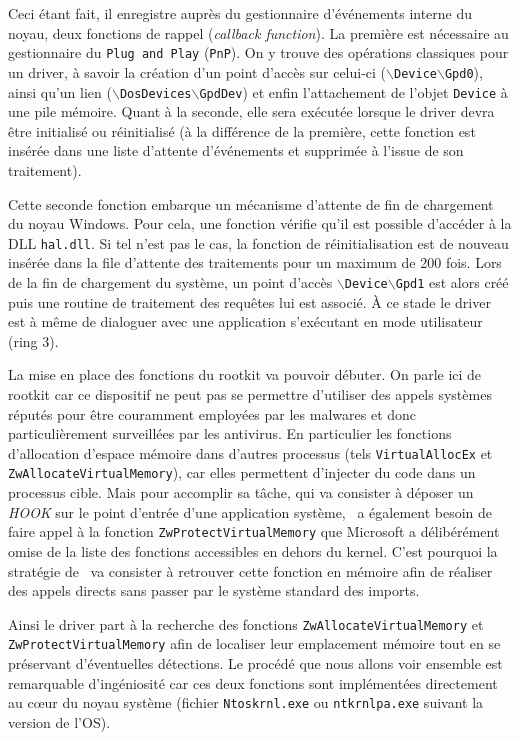 Ceci étant fait, il enregistre auprès du gestionnaire d'événements interne du noyau, deux fonctions de rappel ({\em callback function}). La première est nécessaire au gestionnaire du \texttt{Plug and Play} (\texttt{PnP}). On y trouve des opérations classiques pour un driver, à savoir la création d'un point d'accès sur celui-ci ($\backslash$\texttt{Device}$\backslash$\texttt{Gpd0}), ainsi qu'un lien ($\backslash$\texttt{DosDevices}$\backslash$\texttt{GpdDev}) et enfin l'attachement de l'objet \texttt{Device} à une pile mémoire. Quant à la seconde, elle sera exécutée lorsque le driver devra être initialisé ou réinitialisé (à la différence de la première, cette fonction est insérée dans une liste d'attente d'événements et supprimée à l'issue de son traitement). 
  
Cette seconde fonction embarque un mécanisme d'attente de fin de chargement du noyau Windows. Pour cela, une fonction vérifie qu'il est possible d'accéder à la DLL \texttt{hal.dll}. Si tel n'est pas le cas, la fonction de réinitialisation est de nouveau insérée dans la file d'attente des traitements pour un maximum de 200 fois. 
Lors de la fin de chargement du système, un point d'accès $\backslash$\texttt{Device}$\backslash$\texttt{Gpd1} est alors créé puis une routine de traitement des requêtes lui est associé. À ce stade le driver est à même de dialoguer avec une application s'exécutant en mode utilisateur (ring 3). 

La mise en place des fonctions du rootkit va pouvoir débuter. On parle ici de rootkit car ce dispositif ne peut pas se permettre d'utiliser des appels systèmes réputés pour être couramment employées par les malwares et donc particulièrement surveillées par les antivirus. En particulier les fonctions d'allocation d'espace mémoire dans d'autres processus (tels \texttt{VirtualAllocEx} et \texttt{ZwAllocateVirtualMemory}), car elles permettent d'injecter du code dans un processus cible. Mais pour accomplir sa tâche, qui va consister à déposer un \emph{HOOK} sur le point d'entrée d'une application système, \Duqu\ a également besoin de faire appel à la fonction \texttt{ZwProtectVirtualMemory} que Microsoft a délibérément omise de la liste des fonctions accessibles en dehors du kernel. C'est pourquoi la stratégie de \Duqu\ va consister à retrouver cette fonction en mémoire afin de réaliser des appels directs sans passer par le système standard des imports.

Ainsi le driver part à la recherche des fonctions \texttt{ZwAllocateVirtualMemory} et \texttt{ZwProtectVirtualMemory} afin de localiser leur emplacement mémoire tout en se préservant d'éventuelles détections. Le procédé que nous allons voir ensemble est remarquable d'ingéniosité car ces deux fonctions sont implémentées directement au c\oe ur du noyau système (fichier \texttt{Ntoskrnl.exe} ou \texttt{ntkrnlpa.exe} suivant la version de l'OS). 

